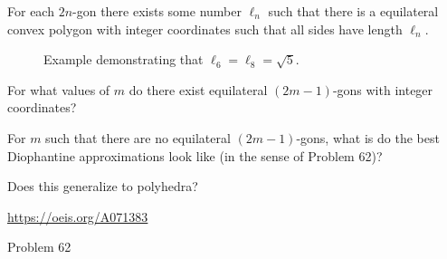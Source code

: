 \documentclass{article}
\begin{document}
  For each $2n$-gon there exists some number $\ell_n$ such that there is a
  equilateral convex polygon with integer coordinates such that all sides have
  length $\ell_n$.
  \begin{figure}[ht!]
    \centering
    \hspace{1cm}
    \caption{
      Example demonstrating that $\ell_6 = \ell_8 = \sqrt{5}$.
    }
  \end{figure}
  \begin{question}
    For what values of $m$ do there exist equilateral $(2m-1)$-gons with integer
    coordinates?
  \end{question}

  \begin{related}
    \item For $m$ such that there are no equilateral $(2m-1)$-gons, what is do
      the best Diophantine approximations look like (in the sense of
      Problem 62)?
    \item Does this generalize to polyhedra?
  \end{related}
  \begin{references}
    \item \url{https://oeis.org/A071383}
    \item Problem 62
  \end{references}
\end{document}
